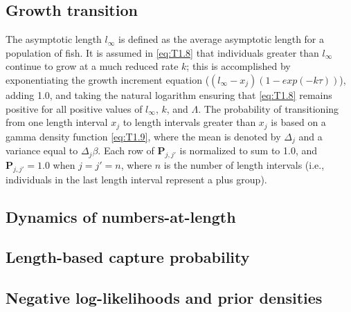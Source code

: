 \subsection{Growth transition} %
\label{sub:growth_transition}
The asymptotic length $l_\infty$ is defined as the average asymptotic length for a population of fish.  It is assumed in \eqref{eq:T1.8} that individuals greater than $l_\infty$ continue to grow at a much reduced rate $k$; this is accomplished by exponentiating the growth increment equation ($(l_\infty-x_j)(1-exp(-k\tau))$), adding 1.0, and taking the natural logarithm ensuring that \eqref{eq:T1.8} remains positive for all positive values of $l_\infty$, $k$, and $\Lambda$.
The probability of transitioning from one length interval $x_j$ to length intervals greater than $x_{j}$ is based on a gamma density function \eqref{eq:T1.9}, where the mean is denoted by $\Delta_j$ and a variance equal to $\Delta_j \beta$.  Each row of $\mathbf{P}_{j,j'}$ is normalized to sum to 1.0, and $\mathbf{P}_{j,j'}=1.0$ when $j=j'=n$, where $n$ is the number of length intervals (i.e., individuals in the last length interval represent a plus group).






\subsection{Dynamics of numbers-at-length} %
\label{sub:dynamics_of_numbers_at_length}


\subsection{Length-based capture probability} %
\label{sub:length_based_capture_probability}


\subsection{Negative log-likelihoods and prior densities} %
\label{sub:negative_log_likelihoods_and_prior_densities}


